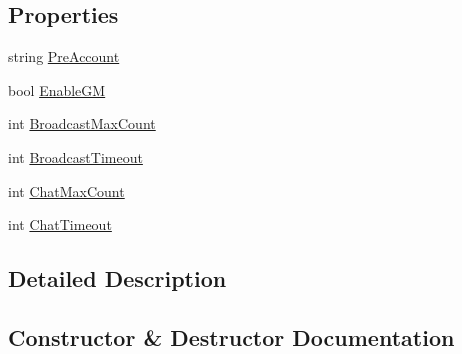 \subsection*{Properties}
\begin{DoxyCompactItemize}
\item 
string \mbox{\hyperlink{class_t_net_1_1_config_1_1_middleware_section_a21dc181aad702f1efd491ecb35f8eab0}{Pre\+Account}}
\item 
bool \mbox{\hyperlink{class_t_net_1_1_config_1_1_middleware_section_a5e8f91f5ed6be6b2951476a17611a946}{Enable\+GM}}
\item 
int \mbox{\hyperlink{class_t_net_1_1_config_1_1_middleware_section_a45f493b4ee0ab4aeb0bd531ff5f7dbc3}{Broadcast\+Max\+Count}}
\item 
int \mbox{\hyperlink{class_t_net_1_1_config_1_1_middleware_section_a87f3daa40cdc8b0ce0dfa48b9ce52d4b}{Broadcast\+Timeout}}
\item 
int \mbox{\hyperlink{class_t_net_1_1_config_1_1_middleware_section_af0c02ecffbf2cef4360b4c1957bca7f3}{Chat\+Max\+Count}}
\item 
int \mbox{\hyperlink{class_t_net_1_1_config_1_1_middleware_section_abb7992723d2f021a3e05f487404c30b5}{Chat\+Timeout}}
\end{DoxyCompactItemize}


\subsection{Detailed Description}




\subsection{Constructor \& Destructor Documentation}
\mbox{\label{class_t_net_1_1_config_1_1_middleware_section_a4ddc3cbb3cb05830df960bc20a6ff5a1}} 
